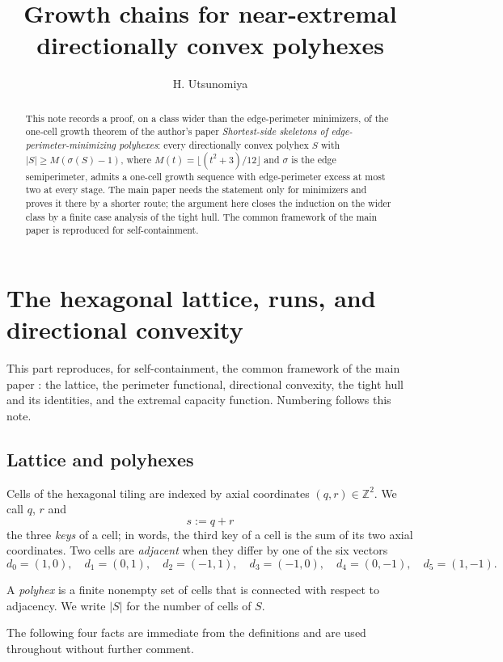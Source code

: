 \documentclass[11pt]{article}
\title{Growth chains for near-extremal directionally convex polyhexes}
\author{H. Utsunomiya}
\date{}
\theoremstyle{plain}
\theoremstyle{definition}
\theoremstyle{remark}
\newcommand{\Z}{\mathbb{Z}}
\begin{document}
\maketitle
\begin{abstract}
This note records a proof, on a class wider than the edge-perimeter minimizers, of the
one-cell growth theorem of the author's paper \emph{Shortest-side skeletons of
edge-perimeter-minimizing polyhexes}: every directionally convex polyhex \(S\) with
\(|S|\ge M(\sigma(S)-1)\), where \(M(t)=\lfloor(t^{2}+3)/12\rfloor\) and \(\sigma\) is the
edge semiperimeter, admits a one-cell growth sequence with edge-perimeter excess at most two
at every stage. The main paper needs the statement only for minimizers and proves it there
by a shorter route; the argument here closes the induction on the wider class by a finite
case analysis of the tight hull. The common framework of the main paper is reproduced for
self-containment.
\end{abstract}

\section{The hexagonal lattice, runs, and directional convexity}\label{sec:prelim}

This part reproduces, for self-containment, the common framework of the main paper
\cite{UtsunomiyaCSGMain}:
the lattice, the perimeter functional, directional convexity, the tight hull and its
identities, and the extremal capacity function. Numbering follows this note.

\subsection{Lattice and polyhexes}\label{sec:2.1}

Cells of the hexagonal tiling are indexed by axial coordinates
\((q,r)\in\Z^{2}\). We call \(q\), \(r\) and
\[
   s:=q+r
\]
the three \emph{keys} of a cell; in words, the third key of a cell is the sum of its two
axial coordinates. Two cells are \emph{adjacent} when they differ by one of the six
vectors
\[
   d_{0}=(1,0),\quad d_{1}=(0,1),\quad d_{2}=(-1,1),\quad
   d_{3}=(-1,0),\quad d_{4}=(0,-1),\quad d_{5}=(1,-1).
\]

A \emph{polyhex} is a finite nonempty set of cells that is connected with respect to
adjacency. We write \(|S|\) for the number of cells of \(S\).

The following four facts are immediate from the definitions and are used throughout
without further comment.
\end{document}
